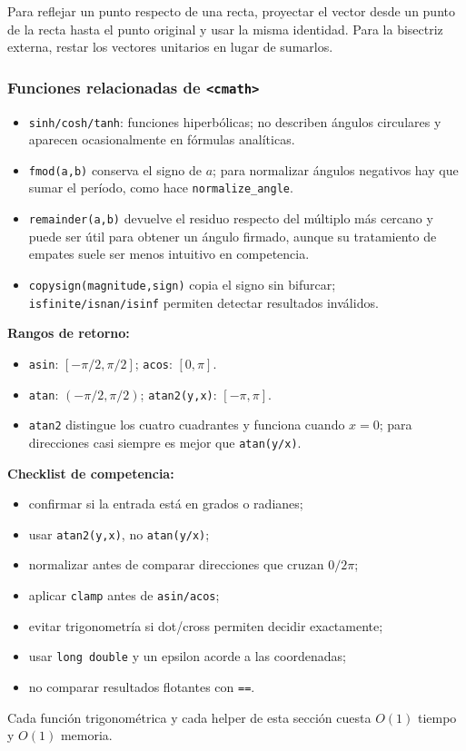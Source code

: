 Para reflejar un punto respecto de una recta, proyectar el vector desde un punto
de la recta hasta el punto original y usar la misma identidad. Para la bisectriz
externa, restar los vectores unitarios en lugar de sumarlos.

\subsubsection{Funciones relacionadas de \texttt{<cmath>}}

\begin{itemize}
  \item \texttt{sinh/cosh/tanh}: funciones hiperb\'olicas; no describen \'angulos
  circulares y aparecen ocasionalmente en f\'ormulas anal\'iticas.
  \item \texttt{fmod(a,b)} conserva el signo de $a$; para normalizar \'angulos
  negativos hay que sumar el per\'iodo, como hace \texttt{normalize\_angle}.
  \item \texttt{remainder(a,b)} devuelve el residuo respecto del m\'ultiplo m\'as
  cercano y puede ser \'util para obtener un \'angulo firmado, aunque su tratamiento
  de empates suele ser menos intuitivo en competencia.
  \item \texttt{copysign(magnitude,sign)} copia el signo sin bifurcar;
  \texttt{isfinite/isnan/isinf} permiten detectar resultados inv\'alidos.
\end{itemize}

\textbf{Rangos de retorno:}
\begin{itemize}
  \item \texttt{asin}: $[-\pi/2,\pi/2]$; \texttt{acos}: $[0,\pi]$.
  \item \texttt{atan}: $(-\pi/2,\pi/2)$; \texttt{atan2(y,x)}: $[-\pi,\pi]$.
  \item \texttt{atan2} distingue los cuatro cuadrantes y funciona cuando
  $x=0$; para direcciones casi siempre es mejor que \texttt{atan(y/x)}.
\end{itemize}


\textbf{Checklist de competencia:}
\begin{itemize}
  \item confirmar si la entrada est\'a en grados o radianes;
  \item usar \texttt{atan2(y,x)}, no \texttt{atan(y/x)};
  \item normalizar antes de comparar direcciones que cruzan $0/2\pi$;
  \item aplicar \texttt{clamp} antes de \texttt{asin/acos};
  \item evitar trigonometr\'ia si dot/cross permiten decidir exactamente;
  \item usar \texttt{long double} y un epsilon acorde a las coordenadas;
  \item no comparar resultados flotantes con \texttt{==}.
\end{itemize}

Cada funci\'on trigonom\'etrica y cada helper de esta secci\'on cuesta $O(1)$
tiempo y $O(1)$ memoria.

